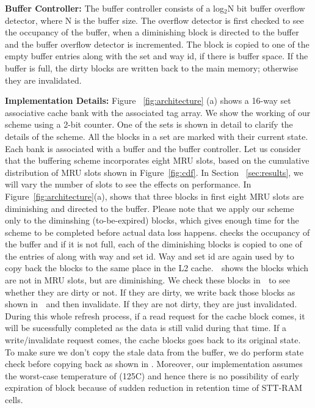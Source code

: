 \noindent\textbf{Buffer Controller:}
The buffer controller consists of a log$_2$N bit buffer overflow detector, where N is the buffer size.
The overflow detector is first checked to see the occupancy of the buffer,
when a diminishing block is directed to the buffer and the buffer overflow detector is incremented.
The block is copied to one of the empty buffer entries along with the set and way id, if there is
buffer space.
If the buffer is full, the dirty blocks are written back to the main memory; otherwise they are  invalidated.

\noindent\textbf{Implementation Details:} Figure ~\ref{fig:architecture} (a) shows a 16-way set
associative cache bank with the associated tag array. We show the working of our scheme using a 2-bit
counter.  One of the sets is shown in detail to clarify the details of the scheme. All the blocks in
a set are marked with their current state. Each bank is  associated with a buffer and the buffer
controller. Let us consider that the buffering scheme incorporates eight MRU slots, based on the
cumulative distribution of MRU slots shown in Figure~\ref{fig:cdf}. In Section ~\ref{sec:results}, we
will vary the number of slots to see the effects on performance. In Figure~\ref{fig:architecture}(a),
 shows that three blocks in first eight MRU slots are diminishing and directed to the
buffer. Please note that we apply our scheme only to the diminshing (to-be-expired) blocks, which gives enough time for the scheme to be completed before actual data loss happens.  checks the occupancy of the buffer and if it is not full, each of the diminishing
blocks is copied to one of the entries of  along with way and set id. Way and set id are
again used by    to copy back the blocks to the same place in the L2 cache. 
\textcircled{\raisebox{-.9pt}{A}} shows the blocks which are not in MRU slots, but are diminishing.
We check these blocks in \textcircled{\raisebox{-.9pt}{B}} to see whether they are dirty or not. If
they are dirty, we write back those blocks as shown in \textcircled{\raisebox{-.9pt}{C}} and then 
invalidate.  If they are not dirty, they are just invalidated. During this whole refresh process, if a read request for the cache block comes, it will be sucessfully completed as the data is still valid during that time. If a write/invalidate request comes, the cache blocks goes back to its original state. To make sure we don't copy the stale data
from the buffer, we do perform state check before copying back as shown in . Moreover, our implementation assumes the worst-case temperature of (125C) and hence there is no possibility of early expiration of block because of sudden reduction in retention time of STT-RAM cells. 


